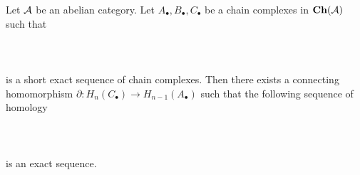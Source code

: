 \documentclass[a4paper]{article}
\begin{document}
\begin{thm}{}{} Let $\mathcal{A}$ be an abelian category. Let $A_\bullet,B_\bullet,C_\bullet$ be a chain complexes in $\bold{Ch}(\mathcal{A})$ such that \\~\\
\\~\\
is a short exact sequence of chain complexes. Then there exists a connecting homomorphism $\partial:H_n(C_\bullet)\to H_{n-1}(A_\bullet)$ such that the following sequence of homology  \\~\\
\\~\\
is an exact sequence. 
\end{thm}
\end{document}
